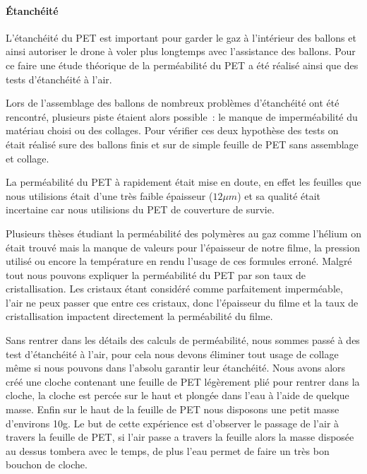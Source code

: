 \documentclass[a4paper,11pt]{article}
\begin{document}
\paragraph{Étanchéité}

L'étanchéité du PET est important pour garder le gaz à l'intérieur des ballons et ainsi autoriser le drone à voler plus longtemps avec l'assistance des ballons. Pour ce faire une étude théorique de la perméabilité du PET a été réalisé ainsi que des tests d'étanchéité à l'air.

Lors de l'assemblage des ballons de nombreux problèmes d'étanchéité ont été rencontré, plusieurs piste étaient alors possible~: le manque de imperméabilité du matériau choisi ou des collages. Pour vérifier ces deux hypothèse des tests on était réalisé sure des ballons finis et sur de simple feuille de PET sans assemblage et collage.


La perméabilité du PET à rapidement était mise en doute, en effet les feuilles que nous utilisions était d'une très faible épaisseur ($12\mu m$) et sa qualité était incertaine car nous utilisions du PET de couverture de survie.

Plusieurs thèses étudiant la perméabilité des polymères au gaz comme l'hélium on était trouvé mais la manque de valeurs pour l'épaisseur de notre filme, la pression utilisé ou encore la température en rendu l'usage de ces formules erroné.
Malgré tout nous pouvons expliquer la perméabilité du PET par son taux de cristallisation. Les cristaux étant considéré comme parfaitement imperméable, l'air ne peux passer que entre ces cristaux, donc l'épaisseur du filme et la taux de cristallisation impactent directement la perméabilité du filme.

Sans rentrer dans les détails des calculs de perméabilité, nous sommes passé à des test d'étanchéité à l'air, pour cela nous devons éliminer tout usage de collage même si nous pouvons dans l'absolu garantir leur étanchéité.
Nous avons alors créé une cloche contenant une feuille de PET légèrement plié pour rentrer dans la cloche, la cloche est percée sur le haut et plongée dans l'eau à l'aide de quelque masse. Enfin sur le haut de la feuille de PET nous disposons une petit masse d'environs 10g.
Le but de cette expérience est d'observer le passage de l'air à travers la feuille de PET, si l'air passe a travers la feuille alors la masse disposée au dessus tombera avec le temps, de plus l'eau permet de faire un très bon bouchon de cloche.
\end{document}
